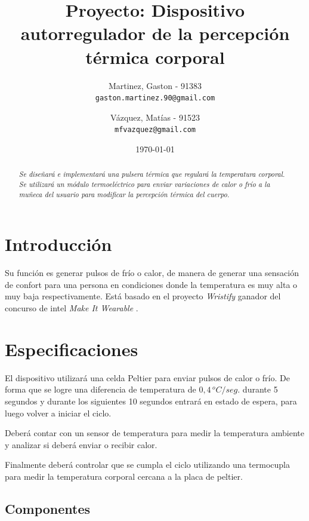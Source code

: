 \documentclass[10pt,spanish,a4paper,openany,notitlepage]{article}
\begin{document}
\title{\textbf{Proyecto: Dispositivo autorregulador de la percepción térmica corporal}}
\author{
  Martinez, Gaston - 91383\\
  \texttt{gaston.martinez.90@gmail.com}  
  \and
   Vázquez, Matías - 91523\\
  \texttt{mfvazquez@gmail.com}
}
\date{\today}
\maketitle

\begin{abstract} %
\emph{Se diseñará e implementará una pulsera térmica que regulará la
temperatura corporal. Se utilizará un módulo termoeléctrico para enviar
variaciones de calor o frío a la muñeca del usuario para modificar
la percepción térmica del cuerpo.}
\end{abstract}

\section{Introducción}

Su función es generar pulsos de frío o calor, de manera de generar una sensación de 
confort para una persona en condiciones donde la temperatura es muy alta 
o muy baja respectivamente.
Está basado en el proyecto \emph{Wristify} \cite{embrlabs} ganador del concurso de intel 
\emph{Make It Wearable} \cite{Make It Wearable}.

\section{Especificaciones}

El dispositivo utilizará una celda Peltier para enviar pulsos de calor
o frío. De forma que se logre una diferencia de temperatura de $0,4\, \unit{^oC/seg.}$
durante 5 segundos y durante los siguientes 10 segundos entrará
en estado de espera, para luego volver a iniciar el ciclo. 

Deberá contar con un sensor de temperatura para medir la temperatura ambiente
y analizar si deberá enviar o recibir calor.

Finalmente deberá controlar que se cumpla el ciclo utilizando una termocupla
para medir la temperatura corporal cercana a la placa de peltier.

\subsection{Componentes}
\end{document}
